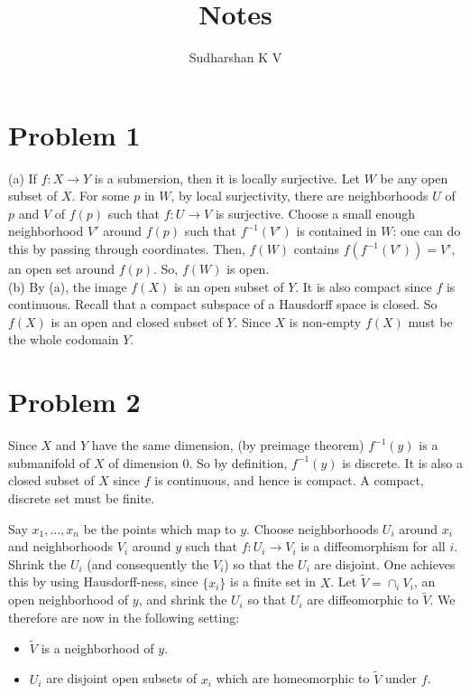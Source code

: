 \documentclass{amsart}
\title{Notes}
\author{Sudharshan K V}
\numberwithin{equation}{section}
\theoremstyle{plain}
\theoremstyle{definition}
\theoremstyle{remark}
\renewcommand{\_}[2]{\underbrace{#1}_{#2}}
\renewcommand{\^}[2]{\overbrace{#1}_{#2}}
\begin{document}
\maketitle

\section*{Problem 1}
(a) If $f: X \to Y$ is a submersion, then it is locally surjective. Let $W$ be any open subset of $X$. For some $p$ in $W$, by local surjectivity, there are neighborhoods $U$ of $p$ and $V$ of $f(p)$ such that $f: U \to V$ is surjective. Choose a small enough neighborhood $V'$ around $f(p)$ such that $f^{-1}(V')$ is contained in $W$: one can do this by passing through coordinates. Then, $f(W)$ contains $f(f^{-1}(V')) = V'$, an open set around $f(p)$. So, $f(W)$ is open.  \\

(b) By (a), the image $f(X)$ is an open subset of $Y$. It is also compact since $f$ is continuous. Recall that a compact subspace of a Hausdorff space is closed. So $f(X)$ is an open and closed subset of $Y$. Since $X$ is non-empty $f(X)$ must be the whole codomain $Y$. 

\section*{Problem 2}
Since $X$ and $Y$ have the same dimension, (by preimage theorem) $f^{-1}(y)$ is a submanifold of $X$ of dimension $0$. So by definition, $f^{-1}(y)$ is discrete. It is also a closed subset of $X$ since $f$ is continuous, and hence is compact. A compact, discrete set must be finite.

Say $x_1, \dots, x_n$ be the points which map to $y$. Choose neighborhoods $U_i$ around $x_i$ and neighborhoods $V_i$ around $y$ such that $f: U_i \to V_i$ is a diffeomorphism for all $i$. Shrink the $U_i$ (and consequently the $V_i$) so that the $U_i$ are disjoint. One achieves this by using Hausdorff-ness, since $\{x_i\}$ is a finite set in $X$. Let $\tilde V = \cap_i V_i$, an open neighborhood of $y$, and shrink the $U_i$ so that $U_i$ are diffeomorphic to $\tilde V$. We therefore are now in the following setting:

\begin{itemize}
\item $\tilde V$ is a neighborhood of $y$.
\item $U_i$ are disjoint open subsets of $x_i$ which are homeomorphic to $\tilde V$ under $f$.
\end{itemize}
\end{document}
